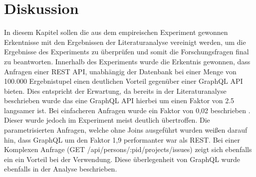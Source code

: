 \chapter{Diskussion} %
\label{sec:diskussion}
In diesem Kapitel sollen die aus dem empireischen Experiment gewonnen Erkentnisse mit den Ergebnissen der Literaturanalyse vereinigt werden, um die Ergebnisse des Experiments zu überprüfen und somit die Forschungsfragen final zu beantworten.
\newline
\noindent
Innerhalb des Experiments wurde die Erkentnis gewonnen, dass Anfragen einer REST API, unabhängig der Datenbank bei einer Menge von 100.000 Ergebnistupel einen deutlichen Vorteil gegenüber einer GraphQL API bieten. Dies entspricht der Erwartung, da bereits in der Literaturanalyse beschrieben wurde das eine GraphQL API hierbei um einen Faktor von 2.5 langsamer ist\citep{restvsgraphql}.
Bei einfacheren Anfragen wurde ein Faktor von 0,02 beschrieben \citep{migrategraphql}. Dieser wurde jedoch im Experiment meist deutlich übertroffen. Die parametrisierten Anfragen, welche ohne Joins ausgeführt wurden weißen darauf hin, dass GraphQL um den Faktor 1,9 performanter war als REST.
Bei einer Komplexen Anfrage (GET /api/persons/:pid/projects/issues) zeigt sich ebenfalls ein ein Vorteil bei der Verwendung. Diese überlegenheit von GraphQL wurde ebenfalls in der Analyse beschrieben. \citep{graphqlreplacerest}

